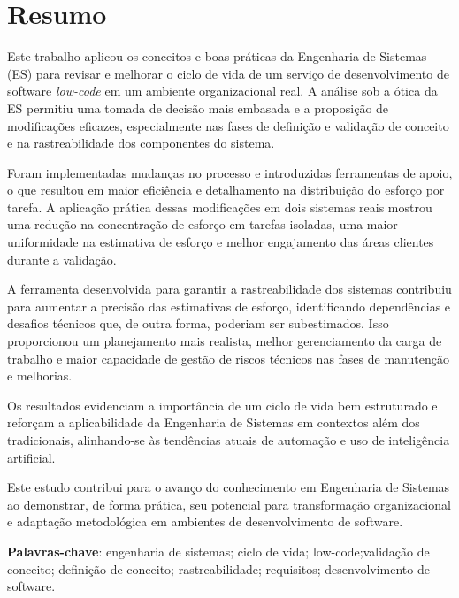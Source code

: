 
\chapter*{Resumo}

	\noindent Este trabalho aplicou os conceitos e boas práticas da Engenharia de Sistemas (ES) para revisar e melhorar o ciclo de vida de um serviço de
	desenvolvimento de software \textit{low-code} em um ambiente organizacional real. A análise sob a ótica da ES permitiu uma tomada de decisão mais embasada e a proposição
	de modificações eficazes, especialmente nas fases de definição e validação de conceito e na rastreabilidade dos componentes do sistema.

	\noindent Foram implementadas mudanças no processo e introduzidas ferramentas de apoio, o que resultou em maior eficiência e detalhamento na distribuição do esforço por tarefa.
	A aplicação prática dessas modificações	em dois sistemas reais mostrou uma redução na concentração de esforço em tarefas isoladas, uma maior uniformidade na
	estimativa de esforço e melhor engajamento das áreas clientes durante a validação.

	\noindent A ferramenta desenvolvida para garantir a rastreabilidade dos sistemas contribuiu para aumentar a precisão das estimativas de esforço, identificando
	dependências e desafios técnicos que, de outra forma, poderiam ser subestimados. Isso proporcionou um planejamento mais realista, melhor gerenciamento da
	carga de trabalho e maior capacidade de gestão de riscos técnicos nas fases de manutenção e melhorias.

	\noindent Os resultados evidenciam a importância de um ciclo de vida bem estruturado e reforçam a aplicabilidade da Engenharia de Sistemas em contextos além
	dos tradicionais, alinhando-se às tendências atuais de automação e uso de inteligência artificial.

	\noindent Este estudo contribui para o avanço do conhecimento em Engenharia de Sistemas ao demonstrar, de forma prática, seu potencial para transformação
	organizacional e adaptação metodológica em ambientes de desenvolvimento de software.


	\vspace{5mm}
	
	\noindent\textbf{Palavras-chave}: engenharia de sistemas; ciclo de vida; low-code;validação de conceito; definição de conceito; rastreabilidade; requisitos; desenvolvimento de software.
	
	\thispagestyle{empty}